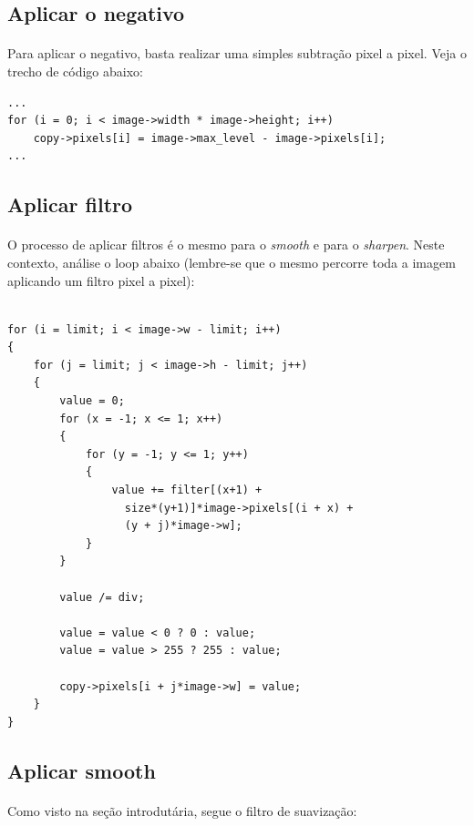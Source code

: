 \documentclass[a4paper,10pt]{article}
\begin{document}
\subsection{Aplicar o negativo}

\paragraph{}
Para aplicar o negativo, basta realizar uma simples subtração pixel a pixel.
Veja o trecho de código abaixo:

\begin{lstlisting}
...
for (i = 0; i < image->width * image->height; i++)
	copy->pixels[i] = image->max_level - image->pixels[i];
...
\end{lstlisting}

\subsection{Aplicar filtro}

\paragraph{}
O processo de aplicar filtros é o mesmo para o \textit{smooth} e para o 
\textit{sharpen}. Neste contexto, análise o loop abaixo (lembre-se que o 
mesmo percorre toda a imagem aplicando um filtro pixel a pixel):

\begin{lstlisting}

for (i = limit; i < image->w - limit; i++)
{
	for (j = limit; j < image->h - limit; j++)
	{
		value = 0;
		for (x = -1; x <= 1; x++)
		{
			for (y = -1; y <= 1; y++)
			{
				value += filter[(x+1) + 
				  size*(y+1)]*image->pixels[(i + x) + 
				  (y + j)*image->w];
			}
		}

		value /= div;

		value = value < 0 ? 0 : value;
		value = value > 255 ? 255 : value;

		copy->pixels[i + j*image->w] = value;
	}
}

\end{lstlisting}

\subsection{Aplicar smooth}

\paragraph{}
Como visto na seção introdutária, segue o filtro de suavização:
\end{document}
